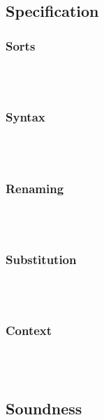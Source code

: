\subsection{Specification}
\subsubsection{Sorts}\hfill\\\\
\FSort
\subsubsection{Syntax}\hfill\\\\

\subsubsection{Renaming}\hfill\\\\

\subsubsection{Substitution}\hfill\\\\

\subsubsection{Context}\hfill\\\\

\subsection{Soundness}
